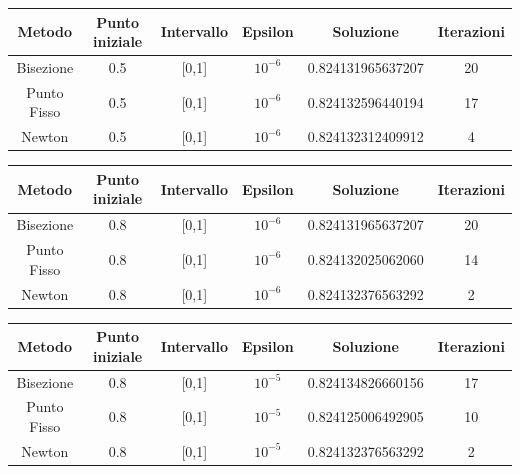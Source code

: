 \documentclass[11pt,a4paper]{article}
\begin{document}
\begin{table}[h!]
\centering
\begin{tabular}{|c|c|c|c|c|c|}
\hline
\textbf{Metodo} & \textbf{Punto iniziale} & \textbf{Intervallo} & \textbf{Epsilon} & \textbf{Soluzione} & \textbf{Iterazioni}  \\ \hline
 Bisezione   & 0.5   &  [0,1]  & \(10^{-6}\) & 0.824131965637207 & 20   \\ \hline
 Punto Fisso & 0.5   &  [0,1]  & \(10^{-6}\) & 0.824132596440194 & 17   \\ \hline
 Newton      & 0.5   &  [0,1]  & \(10^{-6}\) & 0.824132312409912 & 4    \\ \hline
\end{tabular}
\end{table}



\begin{table}[h!]
\centering
\begin{tabular}{|c|c|c|c|c|c|}
\hline
\textbf{Metodo} & \textbf{Punto iniziale} & \textbf{Intervallo} & \textbf{Epsilon} & \textbf{Soluzione} & \textbf{Iterazioni}  \\ \hline
 Bisezione   & 0.8   &  [0,1]  & \(10^{-6}\) & 0.824131965637207 & 20   \\ \hline
 Punto Fisso & 0.8   &  [0,1]  & \(10^{-6}\) & 0.824132025062060 & 14   \\ \hline
 Newton      & 0.8   &  [0,1]  & \(10^{-6}\) & 0.824132376563292 & 2   \\ \hline
\end{tabular}
\end{table}





\begin{table}[h!]
\centering
\begin{tabular}{|c|c|c|c|c|c|}
\hline
\textbf{Metodo} & \textbf{Punto iniziale} & \textbf{Intervallo} & \textbf{Epsilon} & \textbf{Soluzione} & \textbf{Iterazioni}  \\ \hline
 Bisezione   & 0.8   &  [0,1]  & \(10^{-5}\) & 0.824134826660156 & 17   \\ \hline
 Punto Fisso & 0.8   &  [0,1]  & \(10^{-5}\) & 0.824125006492905 & 10   \\ \hline
 Newton      & 0.8   &  [0,1]  & \(10^{-5}\) & 0.824132376563292 & 2    \\ \hline
\end{tabular}
\end{table}
\end{document}
